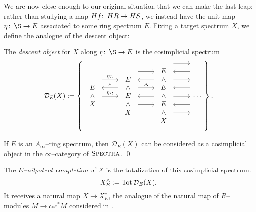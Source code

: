 We are now close enough to our original situation that we can make the last leap: rather than studying a map \(Hf\colon\thinspace HR \to HS\), we instead have the unit map \(\eta\co \S \to E\) associated to some ring spectrum \(E\).  Fixing a target spectrum \(X\), we define the analogue of the descent object:
\begin{definition}
The \textit{descent object} for \(X\) along \(\eta\co \S \to E\) is the cosimplicial spectrum
\[\mathcal{D}_E(X) := \left\{
\begin{tikzcd}
\begin{array}{c} E \\ \sm \\ X \end{array} \arrow[leftarrow, shift left=(\baselineskip)]{r}{\mu} \arrow[shift left=(2*\baselineskip)]{r}{\eta_L} \arrow{r}{\eta_R} &
\begin{array}{c} E \\ \sm \\ E \\ \sm \\ X \end{array} \arrow[shift left=(3*\baselineskip)]{r} \arrow[leftarrow, shift left=(2*\baselineskip)]{r} \arrow[shift left=(\baselineskip)]{r}{\Delta} \arrow[leftarrow]{r} \arrow[shift right=(\baselineskip)]{r} &
\begin{array}{c} E \\ \sm \\ E \\ \sm \\ E \\ \sm \\ X \end{array} \arrow[shift left=(4*\baselineskip)]{r} \arrow[leftarrow, shift left=(3*\baselineskip)]{r} \arrow[shift left=(2*\baselineskip)]{r} \arrow[leftarrow, shift left=(\baselineskip)]{r} \arrow{r} \arrow[leftarrow, shift right=(\baselineskip)]{r} \arrow[shift right=(2*\baselineskip)]{r} &
\cdots
\end{tikzcd}
\right\}.\]
\end{definition}

\begin{lemma}
If \(E\) is an \(A_\infty\)--ring spectrum, then \(\mathcal D_E(X)\) can be considered as a cosimplicial object in the \(\infty\)--category of \(\normalfont\textsc{Spectra}\). \qed
\end{lemma}

\begin{definition}\label{DefnOfNilpCompletionAndASS}
The \textit{\(E\)--nilpotent completion} of \(X\) is the totalization of this cosimplicial spectrum: \[X^\wedge_E := \operatorname{Tot} \mathcal D_E(X).\]  It receives a natural map \(X \to X^\wedge_E\), the analogue of the natural map of \(R\)--modules \(M \to c_* c^* M\) considered in .
\end{definition}

